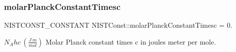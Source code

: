 \subsubsection{\texorpdfstring{molar\+Planck\+Constant\+Timesc}{molarPlanckConstantTimesc}}
{\footnotesize\ttfamily N\+I\+S\+T\+C\+O\+N\+S\+T\+\_\+\+C\+O\+N\+S\+T\+A\+NT N\+I\+S\+T\+Const\+::molar\+Planck\+Constant\+Timesc = 0.}

$N_A hc \ (\frac{J\ m}{mol})$ Molar Planck constant times c in joules meter per mole. 